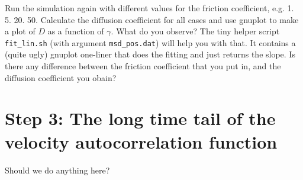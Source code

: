 Run the simulation again with different values for the friction
coefficient, e.g. 1. 5. 20. 50. Calculate the diffusion
coefficient for all cases and use gnuplot to make a plot of
$D$ as a function of $\gamma$. What do you observe?
The tiny helper script \lstinline|fit_lin.sh| 
(with argument \lstinline|msd_pos.dat|)
will help you with that. It contains
a (quite ugly) gnuplot one-liner that does the fitting and just
returns the slope. Is there any difference between the
friction coefficient that you put in, and the diffusion coefficient
you obain?

\section{Step 3: The long time tail of the velocity autocorrelation function}
Should we do anything here?


